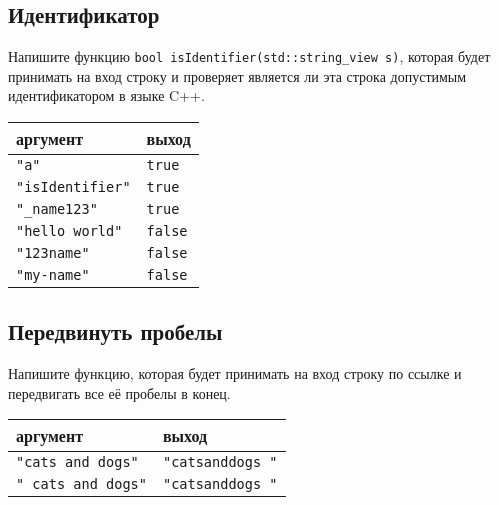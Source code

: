 \documentclass{article}
\begin{document}
\subsection{Идентификатор}
Напишите функцию \texttt{bool isIdentifier(std::string\_view s)}, которая будет принимать на вход строку и проверяет является ли эта строка допустимым идентификатором в языке C++.
\begin{center}
\begin{tabular}{ l | l }
 аргумент & выход \\ \hline
 \texttt{"a"} & \texttt{true} \\
 \texttt{"isIdentifier"} & \texttt{true} \\
 \texttt{"\_name123"} & \texttt{true} \\
 \texttt{"hello world"} & \texttt{false} \\
 \texttt{"123name"} & \texttt{false} \\
 \texttt{"my-name"} & \texttt{false} \\
\end{tabular}
\end{center}


\subsection{Передвинуть пробелы}
Напишите функцию, которая будет принимать на вход строку по ссылке и передвигать все её пробелы в конец.
\begin{center}
\begin{tabular}{ l | l }
 аргумент & выход \\ \hline
 \texttt{"cats and dogs"} & \texttt{"catsanddogs \quad "} \\
 \texttt{"   cats and  dogs"} & \texttt{"catsanddogs  \quad\quad\quad   "} \\
\end{tabular}
\end{center}
\end{document}
